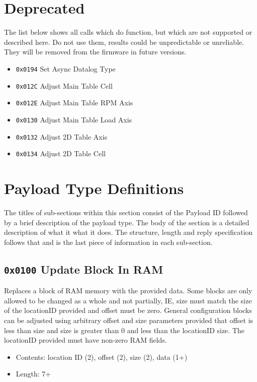 \documentclass[12pt,a4paper,titlepage]{article}
\begin{document}
\section{Deprecated}

The list below shows all calls which do function, but which are not supported or described here. Do not use them, results could be unpredictable or unreliable. They will be removed from the firmware in future versions.

\begin{itemize}
\item \texttt{0x0194} Set Async Datalog Type
\item \texttt{0x012C} Adjust Main Table Cell
\item \texttt{0x012E} Adjust Main Table RPM Axis
\item \texttt{0x0130} Adjust Main Table Load Axis
\item \texttt{0x0132} Adjust 2D Table Axis
\item \texttt{0x0134} Adjust 2D Table Cell
\end{itemize}




\newpage
\section{Payload Type Definitions}

The titles of sub-sections within this section consist of the Payload ID followed by a brief description of the payload type. The body of the section is a detailed description of what it what it does. The structure, length and reply specification follows that and is the last piece of information in each sub-section.


\subsection{\texttt{0x0100} Update Block In RAM}

Replaces a block of RAM memory with the provided data. Some blocks are only allowed to be changed as a whole and not partially, IE, size must match the size of the locationID provided and offset must be zero. General configuration blocks can be adjusted using arbitrary offset and size parameters provided that offset is less than size and size is greater than 0 and less than the locationID size. The locationID provided must have non-zero RAM fields.

\begin{itemize}
\item Contents: location ID (2),  offset (2), size (2), data (1+)
\item Length: 7+
\end{itemize}
\end{document}

